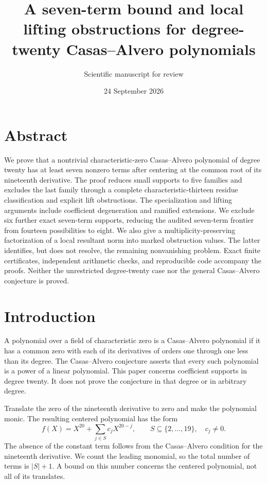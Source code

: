 \documentclass[
  british,
  10pt,
]{article}
\title{A seven-term bound and local lifting obstructions for
degree-twenty Casas--Alvero polynomials}
\subtitle{Scientific manuscript for review}
\author{}
\date{24 September 2026}
\begin{document}
\maketitle

{
\setcounter{tocdepth}{3}
\tableofcontents
}
\section{Abstract}\label{abstract}

We prove that a nontrivial characteristic-zero Casas--Alvero polynomial
of degree twenty has at least seven nonzero terms after centering at the
common root of its nineteenth derivative. The proof reduces small
supports to five families and excludes the last family through a
complete characteristic-thirteen residue classification and explicit
lift obstructions. The specialization and lifting arguments include
coefficient degeneration and ramified extensions. We exclude six further
exact seven-term supports, reducing the audited seven-term frontier from
fourteen possibilities to eight. We also give a multiplicity-preserving
factorization of a local resultant norm into marked obstruction values.
The latter identifies, but does not resolve, the remaining nonvanishing
problem. Exact finite certificates, independent arithmetic checks, and
reproducible code accompany the proofs. Neither the unrestricted
degree-twenty case nor the general Casas--Alvero conjecture is proved.

\section{Introduction}\label{introduction}

A polynomial over a field of characteristic zero is a Casas--Alvero
polynomial if it has a common zero with each of its derivatives of
orders one through one less than its degree. The Casas--Alvero
conjecture asserts that every such polynomial is a power of a linear
polynomial. This paper concerns coefficient supports in degree twenty.
It does not prove the conjecture in that degree or in arbitrary degree.

Translate the zero of the nineteenth derivative to zero and make the
polynomial monic. The resulting centered polynomial has the form \[
f(X)=X^{20}+\sum_{j\in S}c_jX^{20-j},\qquad S\subseteq\{2,\ldots,19\},\quad c_j\ne0.
\] The absence of the constant term follows from the Casas--Alvero
condition for the nineteenth derivative. We count the leading monomial,
so the total number of terms is \(|S|+1\). A bound on this number
concerns the centered polynomial, not all of its translates.
\end{document}
